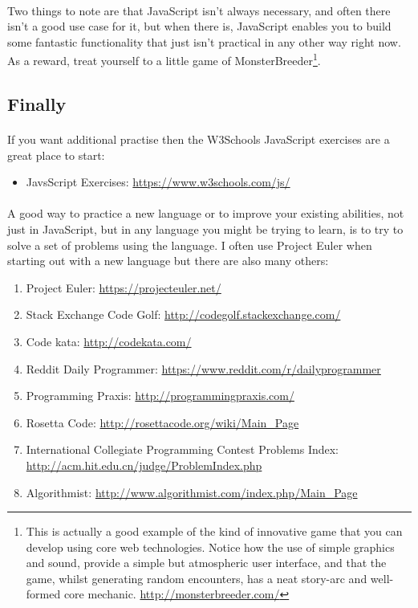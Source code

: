 \documentclass[10pt, a4paper, twosize]{article}
\begin{document}
\paragraph{} Two things to note are that JavaScript isn't always necessary, and often there isn't a good use case for it, but when there is, JavaScript enables you to build some fantastic functionality that just isn't practical in any other way right now. As a reward, treat yourself to a little game of MonsterBreeder\footnote{This is actually a good example of the kind of innovative game that you can develop using core web technologies. Notice how the use of simple graphics and sound, provide a simple but atmospheric user interface, and that the game, whilst generating random encounters, has a neat story-arc and well-formed core mechanic. \url{http://monsterbreeder.com/}}.

\subsection{Finally}
\paragraph{} If you want additional practise then the W3Schools JavaScript exercises are a great place to start:
\begin{itemize}
\item JavsScript Exercises: \url{https://www.w3schools.com/js/}
\end{itemize}

\paragraph{} A good way to practice a new language or to improve your existing abilities, not just in JavaScript, but in any language you might be trying to learn, is to try to solve a set of problems using the language. I often use Project Euler when starting out with a new language but there are also many others:

\begin{enumerate}
\item Project Euler: \url{https://projecteuler.net/}
\item Stack Exchange Code Golf: \url{http://codegolf.stackexchange.com/}
\item Code kata: \url{http://codekata.com/}
\item Reddit Daily Programmer: \url{https://www.reddit.com/r/dailyprogrammer}
\item Programming Praxis: \url{http://programmingpraxis.com/}
\item Rosetta Code: \url{http://rosettacode.org/wiki/Main_Page}
\item International Collegiate Programming Contest Problems Index: \url{http://acm.hit.edu.cn/judge/ProblemIndex.php}
\item Algorithmist: \url{http://www.algorithmist.com/index.php/Main_Page}
\end{enumerate}
\end{document}
